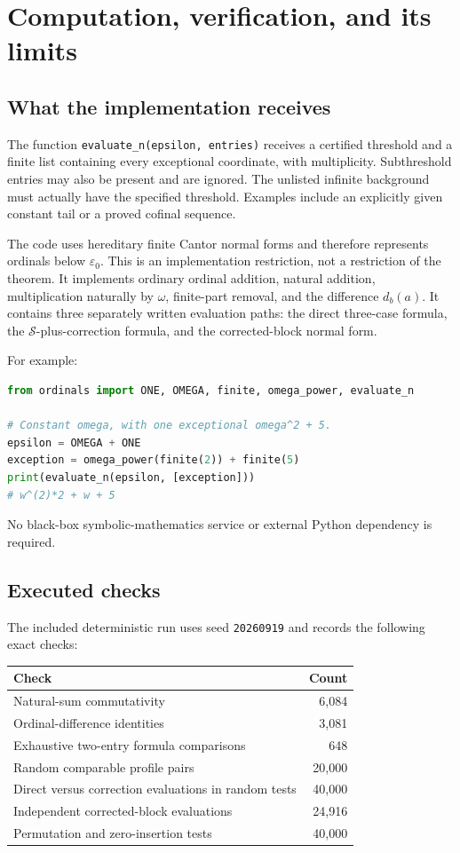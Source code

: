 \documentclass[11pt,letterpaper]{article}
\theoremstyle{definition}
\theoremstyle{remark}
\newcommand{\Sop}{\mathcal S}
\begin{document}
\section{Computation, verification, and its limits}\label{sec:computation}

\subsection{What the implementation receives}

The function \texttt{evaluate\_n(epsilon, entries)} receives a certified threshold and a finite list containing every exceptional coordinate, with multiplicity. Subthreshold entries may also be present and are ignored. The unlisted infinite background must actually have the specified threshold. Examples include an explicitly given constant tail or a proved cofinal sequence.

The code uses hereditary finite Cantor normal forms and therefore represents ordinals below $\varepsilon_0$. This is an implementation restriction, not a restriction of the theorem. It implements ordinary ordinal addition, natural addition, multiplication naturally by $\omega$, finite-part removal, and the difference $d_b(a)$. It contains three separately written evaluation paths: the direct three-case formula, the $\Sop$-plus-correction formula, and the corrected-block normal form.

For example:
\begin{lstlisting}[language=Python]
from ordinals import ONE, OMEGA, finite, omega_power, evaluate_n

# Constant omega, with one exceptional omega^2 + 5.
epsilon = OMEGA + ONE
exception = omega_power(finite(2)) + finite(5)
print(evaluate_n(epsilon, [exception]))
# w^(2)*2 + w + 5
\end{lstlisting}

No black-box symbolic-mathematics service or external Python dependency is required.

\subsection{Executed checks}

The included deterministic run uses seed \texttt{20260919} and records the following exact checks:
\begin{center}\small
\begin{tabular}{@{}lr@{}}
\toprule
Check & Count \\
\midrule
Natural-sum commutativity & 6,084 \\
Ordinal-difference identities & 3,081 \\
Exhaustive two-entry formula comparisons & 648 \\
Random comparable profile pairs & 20,000 \\
Direct versus correction evaluations in random tests & 40,000 \\
Independent corrected-block evaluations & 24,916 \\
Permutation and zero-insertion tests & 40,000 \\
\bottomrule
\end{tabular}
\end{center}
\end{document}
